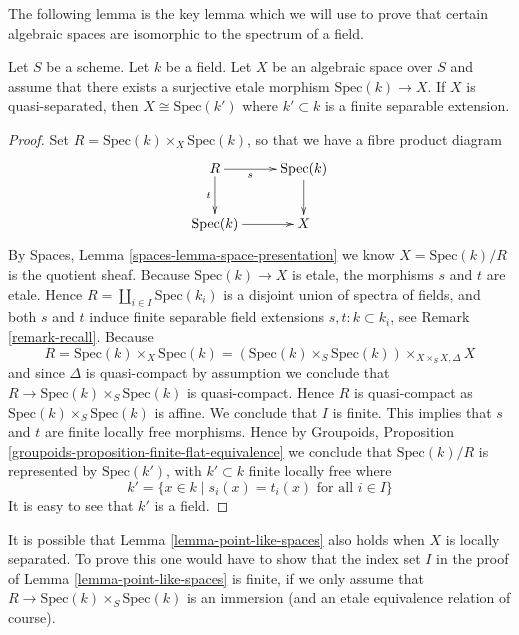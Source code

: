 \noindent
The following lemma is the key lemma which we will use to prove that
certain algebraic spaces are isomorphic to the spectrum of a field.

\begin{lemma}
\label{lemma-point-like-spaces}
Let $S$ be a scheme. Let $k$ be a field.
Let $X$ be an algebraic space over $S$ and assume that there exists
a surjective etale morphism $\text{Spec}(k) \to X$.
If $X$ is quasi-separated, then $X \cong \text{Spec}(k')$
where $k' \subset k$ is a finite separable extension.
\end{lemma}

\begin{proof}
Set $R = \text{Spec}(k) \times_X \text{Spec}(k)$, so that we have a
fibre product diagram
$$
\xymatrix{
R \ar[r]_-s \ar[d]_-t & \text{Spec}(k) \ar[d] \\
\text{Spec}(k) \ar[r] & X
}
$$
By Spaces, Lemma \ref{spaces-lemma-space-presentation}
we know $X = \text{Spec}(k)/R$ is the quotient sheaf.
Because $\text{Spec}(k) \to X$ is etale, the morphisms $s$ and $t$ are etale.
Hence $R = \coprod_{i \in I} \text{Spec}(k_i)$ is a disjoint
union of spectra of fields, and both $s$ and $t$
induce finite separable field extensions $s, t : k \subset k_i$,
see Remark \ref{remark-recall}. Because
$$
R = \text{Spec}(k) \times_X \text{Spec}(k)
= (\text{Spec}(k) \times_S \text{Spec}(k)) \times_{X \times_S X, \Delta} X
$$
and since $\Delta$ is quasi-compact by assumption we conclude that
$R \to \text{Spec}(k) \times_S \text{Spec}(k)$ is quasi-compact.
Hence $R$ is quasi-compact as $\text{Spec}(k) \times_S \text{Spec}(k)$ is
affine. We conclude that $I$ is finite. This implies
that $s$ and $t$ are finite locally free morphisms. Hence by
Groupoids, Proposition \ref{groupoids-proposition-finite-flat-equivalence}
we conclude that $\text{Spec}(k)/R$ is
represented by $\text{Spec}(k')$, with $k' \subset k$ finite locally free
where
$$
k' = \{x \in k \mid s_i(x) = t_i(x)\text{ for all }i \in I\}
$$
It is easy to see that $k'$ is a field.
\end{proof}

\begin{remark}
\label{remark-cannot-decide-yet}
It is possible that
Lemma \ref{lemma-point-like-spaces}
also holds when $X$ is locally separated. To prove this one would
have to show that the index set $I$ in the proof of
Lemma \ref{lemma-point-like-spaces}
is finite, if we only assume that
$R \to \text{Spec}(k) \times_S \text{Spec}(k)$ is an immersion (and an etale
equivalence relation of course).
\end{remark}

